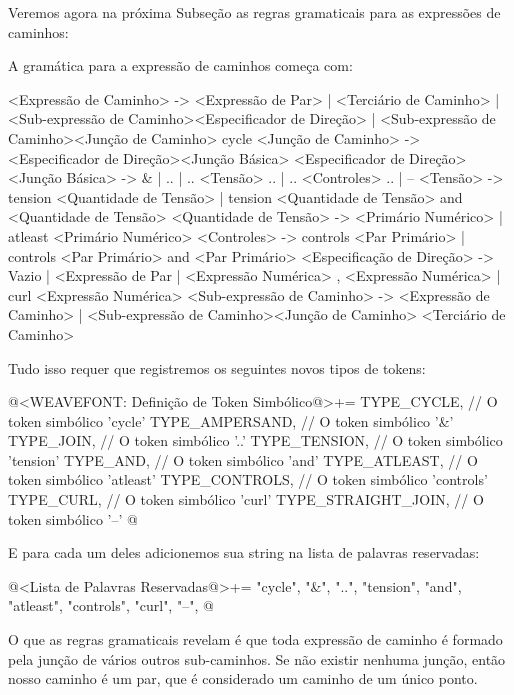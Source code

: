 Veremos agora na próxima Subseção as regras gramaticais para as
expressões de caminhos:


A gramática para a expressão de caminhos começa com:

\alinhaverbatim
<Expressão de Caminho> -> <Expressão de Par> | <Terciário de Caminho> |
                          <Sub-expressão de Caminho><Especificador de Direção> |
                          <Sub-expressão de Caminho><Junção de Caminho> cycle
<Junção de Caminho> -> <Especificador de Direção><Junção Básica>
                       <Especificador de Direção>
<Junção Básica> -> & | .. | .. <Tensão> .. | .. <Controles> .. | --
<Tensão> -> tension <Quantidade de Tensão> |
            tension <Quantidade de Tensão> and <Quantidade de Tensão>
<Quantidade de Tensão> -> <Primário Numérico> | atleast <Primário Numérico>
<Controles> -> controls <Par Primário> |
               controls <Par Primário> and <Par Primário>
<Especificação de Direção> -> Vazio |
                              { <Expressão de Par } |
                              { <Expressão Numérica> , <Expressão Numérica> } |
                              { curl <Expressão Numérica> }
<Sub-expressão de Caminho> -> <Expressão de Caminho> |
                              <Sub-expressão de Caminho><Junção de Caminho>
                              <Terciário de Caminho>
\alinhanormal

Tudo isso requer que registremos os seguintes novos tipos de tokens:

\iniciocodigo
@<WEAVEFONT: Definição de Token Simbólico@>+=
TYPE_CYCLE,          // O token simbólico 'cycle'
TYPE_AMPERSAND,      // O token simbólico '&'
TYPE_JOIN,           // O token simbólico '..'
TYPE_TENSION,        // O token simbólico 'tension'
TYPE_AND,            // O token simbólico 'and'
TYPE_ATLEAST,        // O token simbólico 'atleast'
TYPE_CONTROLS,       // O token simbólico 'controls'
TYPE_CURL,           // O token simbólico 'curl'
TYPE_STRAIGHT_JOIN,  // O token simbólico '--'
@
\fimcodigo

E para cada um deles adicionemos sua string na lista de palavras
reservadas:

\iniciocodigo
@<Lista de Palavras Reservadas@>+=
"cycle", "&", "..", "tension", "and", "atleast", "controls", "curl", "--",
@
\fimcodigo

O que as regras gramaticais revelam é que toda expressão de caminho é
formado pela junção de vários outros sub-caminhos. Se não existir
nenhuma junção, então nosso caminho é um par, que é considerado um
caminho de um único ponto.


